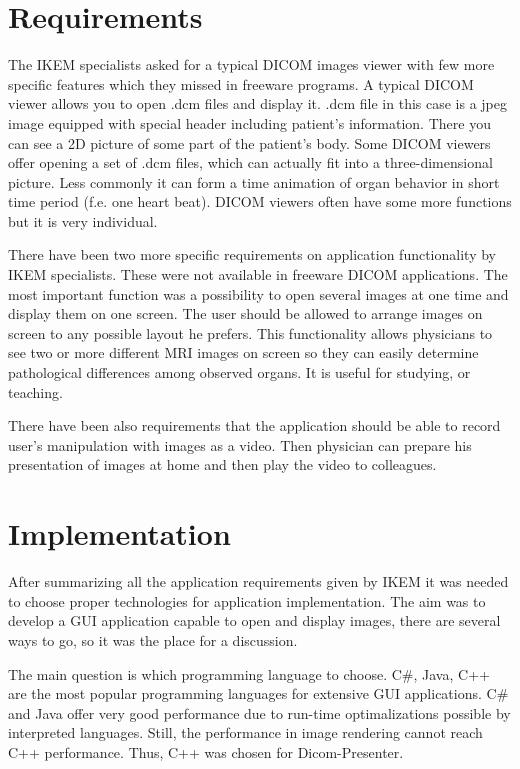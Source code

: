 \section{Requirements}
The IKEM specialists asked for a typical DICOM images viewer with few more specific features which they missed in freeware programs. A typical DICOM viewer allows you to open .dcm files and display it. .dcm file in this case is a jpeg image equipped with special header including patient's information. There you can see a 2D picture of some part of the patient's body. Some DICOM viewers offer opening a set of .dcm files, which can actually fit into a three-dimensional picture. Less commonly it can form a time animation of organ behavior in short time period (f.e. one heart beat). DICOM viewers often have some more functions but it is very individual.

There have been two more specific requirements on application functionality by IKEM specialists. These were not available in freeware DICOM applications. The most important function was a possibility to open several images at one time and display them on one screen. The user should be allowed to arrange images on screen to any possible layout he prefers. This functionality allows physicians to see two or more different MRI images on screen so they can easily determine pathological differences among observed organs. It is useful for studying, or teaching.

There have been also requirements that the application should be able to record user's manipulation with images as a video. Then physician can prepare his presentation of images at home and then play the video to colleagues.

\section{Implementation}
After summarizing all the application requirements given by IKEM it was needed to choose proper technologies for application implementation. The aim was to develop a GUI application capable to open and display images, there are several ways to go, so it was the place for a discussion. 

The main question is which programming language to choose. C\#, Java, C++ are the most popular programming languages for extensive GUI applications. C\# and Java offer very good performance due to run-time optimalizations possible by interpreted languages. Still, the performance in image rendering cannot reach C++ performance. Thus, C++ was chosen for Dicom-Presenter.

